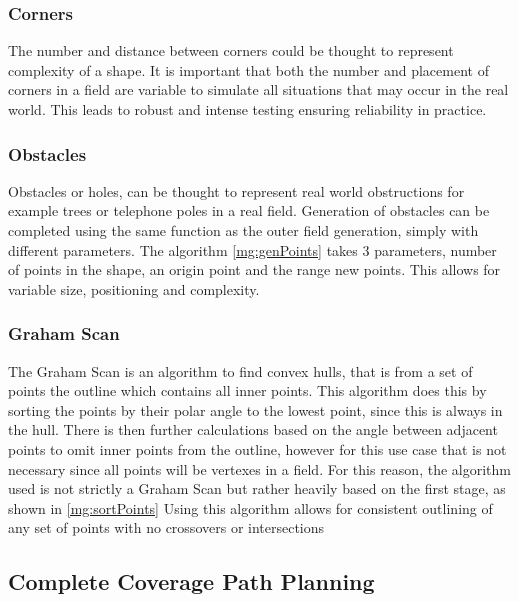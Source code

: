 \documentclass[final]{cmpreport_02}
\begin{document}
\subsubsection{Corners}
The number and distance between corners could be thought to represent complexity of a shape.
It is important that both the number and placement of corners in a field are variable to simulate all situations that may occur in the real world.
This leads to robust and intense testing ensuring reliability in practice.


\subsubsection{Obstacles}
Obstacles or holes, can be thought to represent real world obstructions for example trees or telephone poles in a real field.
Generation of obstacles can be completed using the same function as the outer field generation, simply with different parameters.
The algorithm \ref{mg:genPoints} takes 3 parameters, number of points in the shape, an origin point and the range new points.
This allows for variable size, positioning and complexity.


\subsubsection{Graham Scan}
The Graham Scan \citep{graham1972efficient} is an algorithm to find convex hulls, that is from a set of points the outline which contains all inner points.
This algorithm does this by sorting the points by their polar angle to the lowest point, since this is always in the hull.
There is then further calculations based on the angle between adjacent points to omit inner points from the outline, however for this use case that is not necessary since all points will be vertexes in a field.
For this reason, the algorithm used is not strictly a Graham Scan but rather heavily based on the first stage, as shown in \ref{mg:sortPoints}
Using this algorithm allows for consistent outlining of any set of points with no crossovers or intersections

\subsection{Complete Coverage Path Planning}
\end{document}
